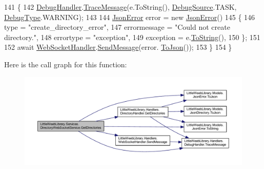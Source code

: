 \begin{DoxyCode}
141             \{
142                 \mbox{\hyperlink{class_little_weeb_library_1_1_handlers_1_1_debug_handler}{DebugHandler}}.\mbox{\hyperlink{class_little_weeb_library_1_1_handlers_1_1_debug_handler_afccb37dfd6b2114af72000c2f4fe4607}{TraceMessage}}(e.ToString(), 
      \mbox{\hyperlink{namespace_little_weeb_library_1_1_handlers_a2a6ca0775121c9c503d58aa254d292be}{DebugSource}}.TASK, \mbox{\hyperlink{namespace_little_weeb_library_1_1_handlers_ab66019ed40462876ec4e61bb3ccb0a62}{DebugType}}.WARNING);
143 
144                 \mbox{\hyperlink{class_little_weeb_library_1_1_models_1_1_json_error}{JsonError}} error = \textcolor{keyword}{new} \mbox{\hyperlink{class_little_weeb_library_1_1_models_1_1_json_error}{JsonError}}()
145                 \{
146                     type = \textcolor{stringliteral}{"create\_directory\_error"},
147                     errormessage = \textcolor{stringliteral}{"Could not create directory."},
148                     errortype = \textcolor{stringliteral}{"exception"},
149                     exception = e.\mbox{\hyperlink{class_little_weeb_library_1_1_models_1_1_json_error_ad7d5522c90119111d2e929f39e7f6d3c}{ToString}}(),
150                 \};
151 
152                 await \mbox{\hyperlink{class_little_weeb_library_1_1_handlers_1_1_web_socket_handler}{WebSocketHandler}}.\mbox{\hyperlink{class_little_weeb_library_1_1_handlers_1_1_web_socket_handler_a1de289d54d665a32c93478c68d3e6ad0}{SendMessage}}(error.
      \mbox{\hyperlink{class_little_weeb_library_1_1_models_1_1_json_error_a0e3e7dd2e2990404b7f0461742b23440}{ToJson}}());
153             \}
154         \}
\end{DoxyCode}
Here is the call graph for this function\+:\nopagebreak
\begin{figure}[H]
\begin{center}
\leavevmode
\includegraphics[width=350pt]{class_little_weeb_library_1_1_services_1_1_directory_web_socket_service_a1fee74b9f658b29f4c2bb643a48425e0_cgraph}
\end{center}
\end{figure}
